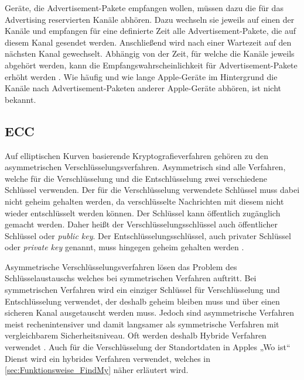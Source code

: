 Geräte, die Advertisement-Pakete empfangen wollen, müssen dazu die für das Advertising reservierten Kanäle abhören.
Dazu wechseln sie jeweils auf einen der Kanäle und empfangen für eine definierte Zeit alle Advertisement-Pakete, die auf diesem Kanal gesendet werden.
Anschließend wird nach einer Wartezeit auf den nächsten Kanal gewechselt.
Abhängig von der Zeit, für welche die Kanäle jeweils abgehört werden, kann die Empfangswahrscheinlichkeit für Advertisement-Pakete erhöht werden \cite{Spec_BLE_5.3}.
Wie häufig und wie lange Apple-Geräte im Hintergrund die Kanäle nach Advertisement-Paketen anderer Apple-Geräte abhören, ist nicht bekannt.

\subsection{\acf{ECC}}
\label{sec:ecc}
Auf elliptischen Kurven basierende Kryptografieverfahren gehören zu den asymmetrischen Verschlüsselungsverfahren.
Asymmetrisch sind alle Verfahren, welche für die Verschlüsselung und die Entschlüsselung zwei verschiedene Schlüssel verwenden.
Der für die Verschlüsselung verwendete Schlüssel muss dabei nicht geheim gehalten werden, da verschlüsselte Nachrichten mit diesem nicht wieder entschlüsselt werden können.
Der Schlüssel kann öffentlich zugänglich gemacht werden.
Daher heißt der Verschlüsselungsschlüssel auch öffentlicher Schlüssel oder \textit{public key}.
Der Entschlüsselungsschlüssel, auch privater Schlüssel oder \textit{private key} genannt, muss hingegen geheim gehalten werden \cite[S. 173ff.]{Krypto}.

Asymmetrische Verschlüsselungsverfahren lösen das Problem des Schlüsselaustauschs welches bei symmetrischen Verfahren auftritt.
Bei symmetrischen Verfahren wird ein einziger Schlüssel für Verschlüsselung und Entschlüsselung verwendet, der deshalb geheim bleiben muss und über einen sicheren Kanal ausgetauscht werden muss.
Jedoch sind asymmetrische Verfahren meist rechenintensiver und damit langsamer als symmetrische Verfahren mit vergleichbarem Sicherheitsniveau.
Oft werden deshalb Hybride Verfahren verwendet \cite[S. 178f.]{Krypto}.
Auch für die Verschlüsselung der Standortdaten in Apples „Wo ist“ Dienst wird ein hybrides Verfahren verwendet, welches in \autoref{sec:Funktionsweise_FindMy} näher erläutert wird.

